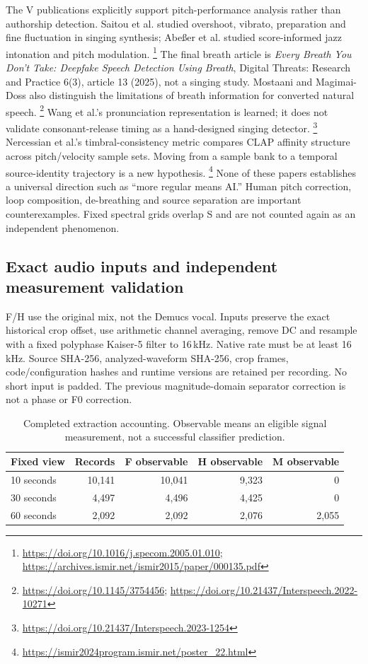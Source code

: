 The V publications explicitly support pitch-performance analysis rather than
authorship detection. Saitou et al. studied overshoot, vibrato, preparation and
fine fluctuation in singing synthesis; Abe\ss er et al. studied score-informed
jazz intonation and pitch modulation.
\footnote{\url{https://doi.org/10.1016/j.specom.2005.01.010};
\url{https://archives.ismir.net/ismir2015/paper/000135.pdf}}
The final breath article is \emph{Every Breath You Don't Take: Deepfake Speech
Detection Using Breath}, Digital Threats: Research and Practice 6(3), article
13 (2025), not a singing study. Mostaani and Magimai-Doss also distinguish
the limitations of breath information for converted natural speech.
\footnote{\url{https://doi.org/10.1145/3754456};
\url{https://doi.org/10.21437/Interspeech.2022-10271}}
Wang et al.'s pronunciation representation is learned; it does not validate
consonant-release timing as a hand-designed singing detector.
\footnote{\url{https://doi.org/10.21437/Interspeech.2023-1254}}
Nercessian et al.'s timbral-consistency metric compares CLAP affinity structure
across pitch/velocity sample sets. Moving from a sample bank to a temporal
source-identity trajectory is a new hypothesis.
\footnote{\url{https://ismir2024program.ismir.net/poster_22.html}}
None of these papers establishes a universal direction such as ``more regular
means AI.'' Human pitch correction, loop composition, de-breathing and source
separation are important counterexamples. Fixed spectral grids overlap S and
are not counted again as an independent phenomenon.

\subsection{Exact audio inputs and independent measurement validation}

F/H use the original mix, not the Demucs vocal. Inputs preserve the exact
historical crop offset, use arithmetic channel averaging, remove DC and resample
with a fixed polyphase Kaiser-5 filter to 16\,kHz. Native rate must be at least
16\,kHz. Source SHA-256, analyzed-waveform SHA-256, crop frames, code/configuration
hashes and runtime versions are retained per recording. No short input is padded.
The previous magnitude-domain separator correction is not a phase or F0 correction.

\begin{table}[htbp]
\centering\small
\caption{Completed extraction accounting. Observable means an eligible signal
measurement, not a successful classifier prediction.}
\label{tab:phenomena-extraction}
\begin{tabular}{lrrrr}
\toprule Fixed view & Records & F observable & H observable & M observable \\
\midrule
10 seconds & 10,141 & 10,041 & 9,323 & 0 \\
30 seconds & 4,497 & 4,496 & 4,425 & 0 \\
60 seconds & 2,092 & 2,092 & 2,076 & 2,055 \\
\bottomrule
\end{tabular}
\end{table}

